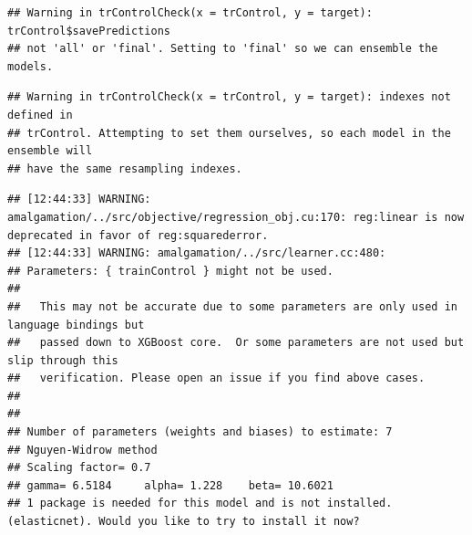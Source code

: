 \documentclass[11pt,]{article}
\newenvironment{Shaded}{\begin{snugshade}}{\end{snugshade}}
\newcommand{\NormalTok}[1]{#1}
\newcommand{\OperatorTok}[1]{\textcolor[rgb]{0.81,0.36,0.00}{\textbf{#1}}}
\begin{document}
\begin{verbatim}
## Warning in trControlCheck(x = trControl, y = target): trControl$savePredictions
## not 'all' or 'final'. Setting to 'final' so we can ensemble the models.
\end{verbatim}

\begin{verbatim}
## Warning in trControlCheck(x = trControl, y = target): indexes not defined in
## trControl. Attempting to set them ourselves, so each model in the ensemble will
## have the same resampling indexes.
\end{verbatim}

\begin{verbatim}
## [12:44:33] WARNING: amalgamation/../src/objective/regression_obj.cu:170: reg:linear is now deprecated in favor of reg:squarederror.
## [12:44:33] WARNING: amalgamation/../src/learner.cc:480: 
## Parameters: { trainControl } might not be used.
## 
##   This may not be accurate due to some parameters are only used in language bindings but
##   passed down to XGBoost core.  Or some parameters are not used but slip through this
##   verification. Please open an issue if you find above cases.
## 
## 
## Number of parameters (weights and biases) to estimate: 7 
## Nguyen-Widrow method
## Scaling factor= 0.7 
## gamma= 6.5184     alpha= 1.228    beta= 10.6021 
## 1 package is needed for this model and is not installed. (elasticnet). Would you like to try to install it now?
\end{verbatim}

\begin{Shaded}
\end{Shaded}
\end{document}
